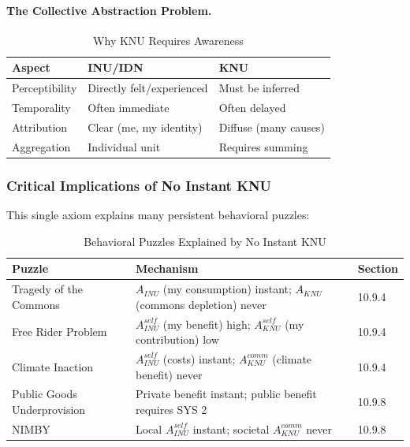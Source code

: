 \paragraph{The Collective Abstraction Problem.}
\begin{table}[htbp]
\centering
\caption{Why KNU Requires Awareness}
\label{tab:knu-abstraction}
\renewcommand{\arraystretch}{1.3}
\begin{tabular}{@{}lll@{}}
\toprule
\textbf{Aspect} & \textbf{INU/IDN} & \textbf{KNU} \\
\midrule
Perceptibility & Directly felt/experienced & Must be inferred \\
Temporality & Often immediate & Often delayed \\
Attribution & Clear (me, my identity) & Diffuse (many causes) \\
Aggregation & Individual unit & Requires summing \\
\bottomrule
\end{tabular}
\end{table}

\subsubsection{Critical Implications of No Instant KNU}

This single axiom explains many persistent behavioral puzzles:

\begin{table}[htbp]
\centering
\caption{Behavioral Puzzles Explained by No Instant KNU}
\label{tab:knu-puzzles}
\renewcommand{\arraystretch}{1.4}
\begin{tabular}{@{}lp{6cm}l@{}}
\toprule
\textbf{Puzzle} & \textbf{Mechanism} & \textbf{Section} \\
\midrule
Tragedy of the Commons & $A_{INU}$ (my consumption) instant; $A_{KNU}$ (commons depletion) never & 10.9.4 \\
Free Rider Problem & $A^{self}_{INU}$ (my benefit) high; $A^{self}_{KNU}$ (my contribution) low & 10.9.4 \\
Climate Inaction & $A^{self}_{INU}$ (costs) instant; $A^{comm}_{KNU}$ (climate benefit) never & 10.9.4 \\
Public Goods Underprovision & Private benefit instant; public benefit requires SYS 2 & 10.9.8 \\
NIMBY & Local $A^{self}_{INU}$ instant; societal $A^{comm}_{KNU}$ never & 10.9.8 \\
\bottomrule
\end{tabular}
\end{table}

